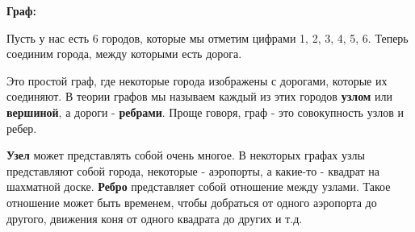 \vspace{\baselineskip}
\textbf{Граф:}

\vspace{\baselineskip}
Пусть у нас есть 6 городов, которые мы отметим цифрами 1, 2, 3, 4, 5, 6. Теперь соединим города, между которыми есть дорога.


Это простой граф, где некоторые города изображены с дорогами, которые их соединяют. В теории графов мы называем каждый из этих городов \textbf{узлом} или \textbf{вершиной}, а дороги - \textbf{ребрами}. Проще говоря, граф - это совокупность узлов и ребер.

\vspace{\baselineskip}
\textbf{Узел} может представлять собой очень многое. В некоторых графах узлы представляют собой города, некоторые - аэропорты, а какие-то -  квадрат на шахматной доске. \textbf{Ребро} представляет собой отношение между узлами. Такое отношение может быть временем, чтобы добраться от одного аэропорта до другого, движения коня от одного квадрата до других  и т.д.